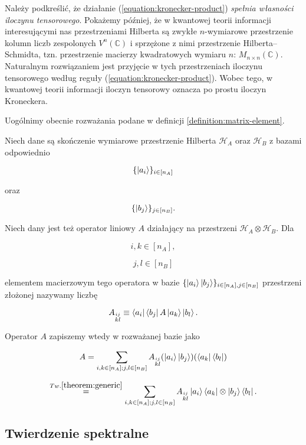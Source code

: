 Należy podkreślić, że działanie (\ref{equation:kronecker-product}) \textit{spełnia własności iloczynu tensorowego}. Pokażemy później, że w kwantowej teorii informacji interesującymi nas przestrzeniami Hilberta są zwykłe $n$-wymiarowe przestrzenie kolumn liczb zespolonych $V ^ n (\mathbb{C})$ i sprzężone z nimi przestrzenie Hilberta--Schmidta, tzn. przestrzenie macierzy kwadratowych wymiaru $n$: $M_{n\times n}(\mathbb{C})$. Naturalnym rozwiązaniem jest przyjęcie w tych przestrzeniach iloczynu tensorowego według reguły (\ref{equation:kronecker-product}). Wobec tego, w kwantowej teorii informacji iloczyn tensorowy oznacza po prostu iloczyn Kroneckera.

Uogólnimy obecnie rozważania podane w definicji \ref{definition:matrix-element}.

Niech dane są skończenie wymiarowe przestrzenie Hilberta $\mathcal{H}_{A}$ oraz $\mathcal{H}_{B}$ z bazami odpowiednio

$$
    \{\ket{a_{i}}\}_{i \in [n_{A}]}
$$

oraz

$$
    \{\ket{b_{j}}\}_{j \in [n_{B}]}.
$$

Niech dany jest też operator liniowy $A$ działający na przestrzeni $\mathcal{H}_{A} \otimes \mathcal{H}_{B}$. Dla

$$
    i, k \in [n_{A}],
$$

$$
    j,l \in [n_{B}]
$$

elementem macierzowym tego operatora w bazie $\{\ket{a_{i}} \ket{b_{j}}\}_{i \in [n_{A}], j \in [n_{B}]}$ przestrzeni złożonej nazywamy liczbę

$$
    A_{\stackrel{ij}{kl}} \equiv \bra{a_{i}} \bra{b_{j}} A \ket{a_{k}} \ket{b_{l}}.
$$

Operator $A$ zapiszemy wtedy w rozważanej bazie jako

$$
    A = \sum\limits_{i, k \in [n_{A}]; j, l \in [n_{B}]} A_{\stackrel{ij}{kl}} (\ket{a_{i}} \ket{b_{j}}) (\bra{a_{k}} \bra{b_{l}})
$$

\begin{equation}
    \label{equation:elements}
    \stackrel{Tw. \ref{theorem:generic}}{=} \sum\limits_{i, k \in [n_{A}]; j, l \in [n_{B}]} A_{\stackrel{ij}{kl}} \ket{a_{i}} \bra{a_{k}} \otimes \ket{b_{j}} \bra{b_{l}}.
\end{equation}

\subsection{Twierdzenie spektralne}


